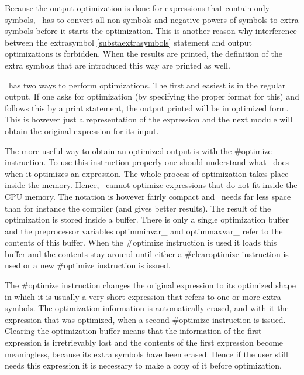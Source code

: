 Because the output optimization is done for expressions that contain only 
symbols, \FORM\ has to convert all non-symbols and negative 
powers of symbols to extra symbols before it starts 
the optimization. This is another reason why interference between the 
extrasymbol \ref{substaextrasymbols} statement and 
output optimizations is forbidden. When the results are printed, the 
definition of the extra symbols that are introduced this way are printed as 
well.

\FORM\ has two ways to perform optimizations. The first and easiest is in 
the regular output. If one asks for optimization (by specifying the proper 
format for this) and follows this by a print statement, the output printed 
will be in optimized form. This is however just a representation of the 
expression and the next module will obtain the original expression for its 
input.

The more useful way to obtain an optimized output is with the \#optimize 
instruction. To use this instruction properly one should understand what 
\FORM\ does when it optimizes an expression. The whole process of 
optimization takes place inside the memory. Hence, \FORM\ cannot optimize 
expressions that do not fit inside the CPU memory. The notation is however 
fairly compact and \FORM\ needs far less space than for instance the 
compiler (and gives better results). The result of the optimization is 
stored inside a buffer. There is only a single optimization 
buffer and the preprocessor variables 
optimminvar\_ and optimmaxvar\_ 
refer to the contents of this buffer. When the \#optimize instruction is 
used it loads this buffer and the contents stay around until either a 
\#clearoptimize instruction is used or a new \#optimize instruction is 
issued.

The \#optimize instruction changes the original expression to its optimized 
shape in which it is usually a very short expression that refers to one or 
more extra symbols. The optimization information is automatically erased, 
and with it the expression that was optimized, when a second \#optimize 
instruction is issued. Clearing the optimization buffer means that the 
information of the first expression is irretrievably lost and the contents 
of the first expression become meaningless, because its extra symbols have 
been erased. Hence if the user still needs this expression it is necessary 
to make a copy of it before optimization.


